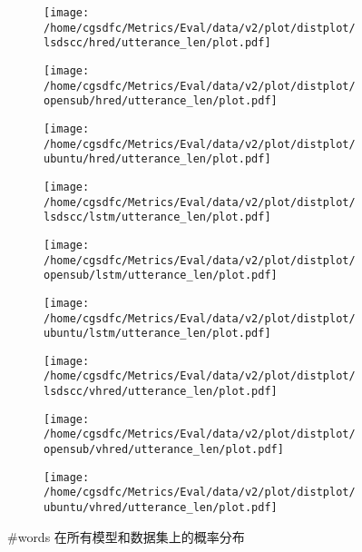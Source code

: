 \begin{figure}[H]%
\centering%
\begin{subfigure}{0.3333333333333333\linewidth}%
\centering%
\texttt{[image: /home/cgsdfc/Metrics/Eval/data/v2/plot/distplot/lsdscc/hred/utterance\_len/plot.pdf]}%
\end{subfigure}%
\begin{subfigure}{0.3333333333333333\linewidth}%
\centering%
\texttt{[image: /home/cgsdfc/Metrics/Eval/data/v2/plot/distplot/opensub/hred/utterance\_len/plot.pdf]}%
\end{subfigure}%
\begin{subfigure}{0.3333333333333333\linewidth}%
\centering%
\texttt{[image: /home/cgsdfc/Metrics/Eval/data/v2/plot/distplot/ubuntu/hred/utterance\_len/plot.pdf]}%
\end{subfigure}%
\newline%
\begin{subfigure}{0.3333333333333333\linewidth}%
\centering%
\texttt{[image: /home/cgsdfc/Metrics/Eval/data/v2/plot/distplot/lsdscc/lstm/utterance\_len/plot.pdf]}%
\end{subfigure}%
\begin{subfigure}{0.3333333333333333\linewidth}%
\centering%
\texttt{[image: /home/cgsdfc/Metrics/Eval/data/v2/plot/distplot/opensub/lstm/utterance\_len/plot.pdf]}%
\end{subfigure}%
\begin{subfigure}{0.3333333333333333\linewidth}%
\centering%
\texttt{[image: /home/cgsdfc/Metrics/Eval/data/v2/plot/distplot/ubuntu/lstm/utterance\_len/plot.pdf]}%
\end{subfigure}%
\newline%
\begin{subfigure}{0.3333333333333333\linewidth}%
\centering%
\texttt{[image: /home/cgsdfc/Metrics/Eval/data/v2/plot/distplot/lsdscc/vhred/utterance\_len/plot.pdf]}%
\end{subfigure}%
\begin{subfigure}{0.3333333333333333\linewidth}%
\centering%
\texttt{[image: /home/cgsdfc/Metrics/Eval/data/v2/plot/distplot/opensub/vhred/utterance\_len/plot.pdf]}%
\end{subfigure}%
\begin{subfigure}{0.3333333333333333\linewidth}%
\centering%
\texttt{[image: /home/cgsdfc/Metrics/Eval/data/v2/plot/distplot/ubuntu/vhred/utterance\_len/plot.pdf]}%
\end{subfigure}%
\caption{\#words 在所有模型和数据集上的概率分布}%
\label{fig:words{-}dist{-}all}%
\end{figure}